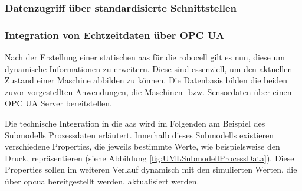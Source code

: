 \subsubsection{Datenzugriff über standardisierte Schnittstellen}



\newpage
\subsubsection{Integration von Echtzeitdaten über OPC UA}
Nach der Erstellung einer statischen \acs{aas} für die robocell gilt es nun, diese um dynamische Informationen zu erweitern.
Diese sind essenziell, um den aktuellen Zustand einer Maschine abbilden zu können.
Die Datenbasis bilden die beiden zuvor vorgestellten Anwendungen, die Maschinen- bzw. Sensordaten über einen OPC UA Server bereitstellen.




Die technische Integration in die \acs{aas} wird im Folgenden am Beispiel des Submodells Prozessdaten erläutert.
Innerhalb dieses Submodells existieren verschiedene Properties, die jeweils bestimmte Werte, wie beispielsweise den Druck, repräsentieren (siehe Abbildung \ref{fig:UMLSubmodellProcessData}). 
Diese Properties sollen im weiteren Verlauf dynamisch mit den simulierten Werten, die über \acs{opcua} bereitgestellt werden, aktualisiert werden.

